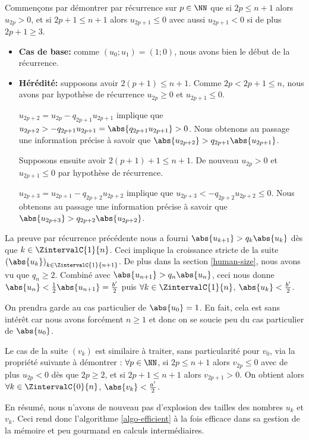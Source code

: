 \medskip


Commençons par démontrer par récurrence sur $p \in \NN$ que si $2p \leq n+1$ alors $u_{2p} > 0$, et si $2p + 1 \leq n+1$ alors $u_{2p+1} \leq 0$ avec aussi $u_{2p+1} < 0$ si de plus $2p+1 \geq 3$.

\begin{itemize}[label = \small\textbullet]
	\item \textbf{Cas de base:} comme $(u_0 ; u_1) = (1 ; 0)$, nous avons bien le début de la récurrence.


	\item  \textbf{Hérédité:} supposons avoir $2(p+1) \leq n+1$. Comme $2p < 2p + 1 \leq n$, nous avons par hypothèse de récurrence $u_{2p} \geq 0$ et $u_{2p+1} \leq 0$.
	
	\noindent
	$u_{2p+2} = u_{2p} - q_{2p+1} u_{2p+1}$ implique que 
	$u_{2p+2} > - q_{2p+1} u_{2p+1} = \abs{q_{2p+1} u_{2p+1}} > 0$.
	Nous obtenons au passage une information précise à savoir que $\abs{u_{2p+2}} > q_{2p+1} \abs{u_{2p+1}}$.
	
	
	\medskip
	\noindent
	Supposons ensuite avoir $2(p+1) + 1 \leq n+1$. De nouveau $u_{2p} > 0$ et $u_{2p+1} \leq 0$ par hypothèse de récurrence.
	
	\noindent
	$u_{2p+3} = u_{2p+1} - q_{2p+2} u_{2p+2}$ implique que
	$u_{2p+3} < - q_{2p+2} u_{2p+2} \leq 0$.
	Nous obtenons au passage une information précise à savoir que $\abs{u_{2p+3}} > q_{2p+2} \abs{u_{2p+2}}$.
\end{itemize}


La preuve par récurrence précédente nous a fourni $\abs{u_{k+1}} > q_k \abs{u_k}$ dès que $k \in \ZintervalC{1}{n}$. Ceci implique la croissance stricte de la suite $\left( \abs{u_k} \right)_{k \in \ZintervalC{1}{n+1}}$.
De plus dans la section \ref{human-size}, nous avons vu que $q_n \geq 2$. Combiné avec $\abs{u_{n+1}} > q_n \abs{u_n}$, ceci nous donne $\abs{u_n} < \frac{1}{2} \abs{u_{n+1}} = \frac{b^\prime}{2}$ puis $\forall k \in \ZintervalC{1}{n}$, $\abs{u_k} < \frac{b^\prime}{2}$.


\medskip


On prendra garde au cas particulier de $\abs{u_0} = 1$. En fait, cela est sans intérêt car nous avons forcément $n \geq 1$ et donc on se soucie peu du cas particulier de $\abs{u_0}$. 


\medskip


Le cas de la suite $(v_k)$ est similaire à traiter, sans particularité pour $v_0$, via la propriété suivante à démontrer :
$\forall p \in \NN$, si $2p \leq n+1$ alors $v_{2p} \leq 0$ avec de plus $u_{2p} < 0$ dès que $2p \geq 2$, et si $2p + 1 \leq n+1$ alors $v_{2p+1} > 0$.
On obtient alors $\forall k \in \ZintervalC{0}{n}$, $\abs{v_k} < \frac{a^\prime}{2}$.


\medskip


En résumé, nous n'avons de nouveau pas d'explosion des tailles des nombres $u_k$ et $v_k$. Ceci rend donc l'algorithme \ref{algo-efficient} à la fois efficace dans sa gestion de la mémoire et peu gourmand en calculs intermédiaires.